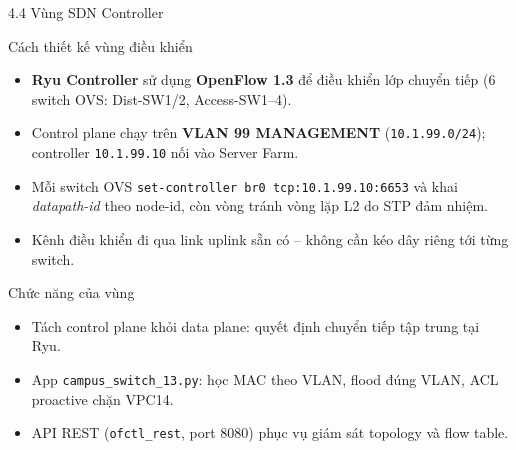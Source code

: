 \begin{frame}{4.4 Vùng SDN Controller}
    \small
    \begin{block}{Cách thiết kế vùng điều khiển}
        \begin{itemize}
            \item \textbf{Ryu Controller} sử dụng \textbf{OpenFlow 1.3}
                  để điều khiển lớp chuyển tiếp (6 switch OVS: Dist-SW1/2,
                  Access-SW1--4).
            \item Control plane chạy trên \textbf{VLAN 99 MANAGEMENT}
                  (\texttt{10.1.99.0/24}); controller \texttt{10.1.99.10}
                  nối vào Server Farm.
            \item Mỗi switch OVS \texttt{set-controller br0
                  tcp:10.1.99.10:6653} và khai \emph{datapath-id} theo
                  node-id, còn vòng tránh vòng lặp L2 do STP đảm nhiệm.
            \item Kênh điều khiển đi qua link uplink sẵn có -- không cần
                  kéo dây riêng tới từng switch.
        \end{itemize}
    \end{block}
    \vspace{0.02cm}
    \begin{block}{Chức năng của vùng}
        \begin{itemize}
            \item Tách control plane khỏi data plane: quyết định chuyển
                  tiếp tập trung tại Ryu.
            \item App \texttt{campus\_switch\_13.py}: học MAC theo VLAN,
                  flood đúng VLAN, ACL proactive chặn VPC14.
            \item API REST (\texttt{ofctl\_rest}, port 8080) phục vụ
                  giám sát topology và flow table.
        \end{itemize}
    \end{block}
\end{frame}

